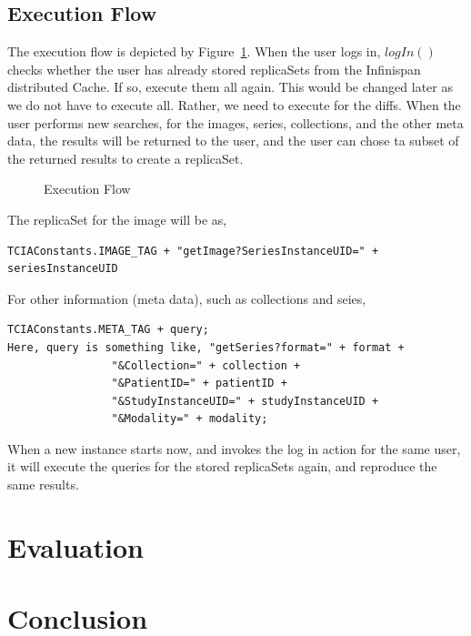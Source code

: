 \documentclass[conference]{IEEEtran}
\begin{document}
\subsection{Execution Flow}
The execution flow is depicted by Figure~\ref{fig:execution}. When the user logs in, $logIn()$ checks whether the user has already stored replicaSets from the Infinispan distributed Cache. If so, execute them all again. This would be changed later as we do not have to execute all. Rather, we need to execute for the diffs. When the user performs new searches, for the images, series, collections, and the other meta data, the results will be returned to the user, and the user can chose ta subset of the returned results to create a replicaSet.
\begin{figure}[ht]
\begin{center}
\end{center}
 \caption{Execution Flow}
 \label{fig:execution}
\end{figure}
The replicaSet for the image will be as,
\begin{lstlisting}  
TCIAConstants.IMAGE_TAG + "getImage?SeriesInstanceUID=" + seriesInstanceUID
\end{lstlisting}  
For other information (meta data), such as collections and seies,
\begin{lstlisting}  
TCIAConstants.META_TAG + query;
Here, query is something like, "getSeries?format=" + format +
                "&Collection=" + collection +
                "&PatientID=" + patientID +
                "&StudyInstanceUID=" + studyInstanceUID +
                "&Modality=" + modality;
\end{lstlisting}  
When a new instance starts now, and invokes the log in action for the same user, it will execute the queries for the stored replicaSets again, and reproduce the same results.
\section{Evaluation}
\section{Conclusion}
\balance

\end{document}
